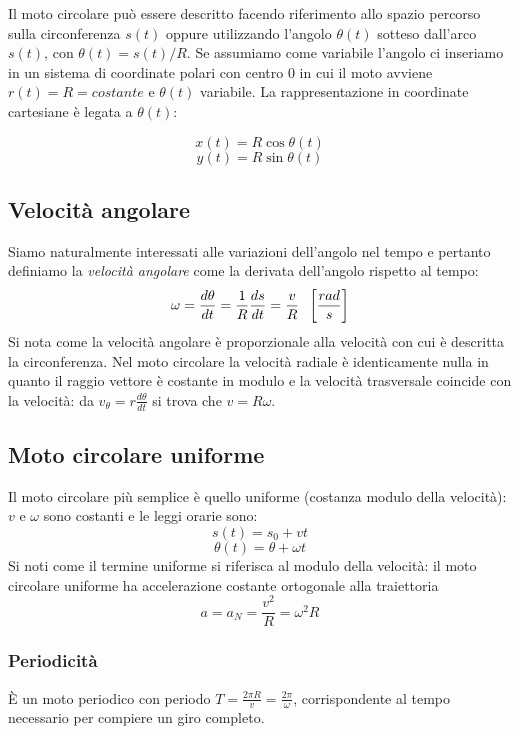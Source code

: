 \documentclass[class=book, crop=false, oneside, 12pt]{standalone}
\begin{document}
Il moto circolare può essere descritto facendo riferimento allo spazio percorso sulla circonferenza \(s(t)\) oppure
utilizzando l'angolo \(\theta (t)\) sotteso dall'arco \(s(t)\), con \(\theta(t) = s(t)/R\).
Se assumiamo come variabile l'angolo ci inseriamo in un sistema di coordinate polari con centro \(0\) in cui il moto avviene \(r(t) = R = costante\) e \(\theta(t)\) variabile.
La rappresentazione in coordinate cartesiane \`e legata a $\theta(t)$:
\begin{multicols}{2}
  \noindent
  $$x(t)=R\cos\theta(t)$$
  $$y(t)=R\sin\theta(t)$$
\end{multicols}
  \subsection{Velocit\`a angolare}
  Siamo naturalmente interessati alle variazioni dell'angolo nel tempo e pertanto definiamo la \emph{velocità angolare} come la derivata dell'angolo rispetto al tempo:
  \begin{equation}
   \omega = \frac{d \theta}{dt} = \frac{1}{R} \frac {ds} {dt} = \frac{v}{R} \hspace{0.2cm} \left[\frac{rad}{s}\right]
  \end{equation}
	Si nota come la velocit\`a angolare \`e proporzionale alla velocit\`a con cui \`e descritta la circonferenza.
	Nel moto circolare la velocit\`a radiale \`e identicamente nulla in quanto il raggio vettore \`e costante in modulo e la velocit\`a trasversale coincide con la velocit\`a: da $v_\theta=r\frac{d\theta}{dt}$ si trova che $v=R\omega$.
  \subsection{Moto circolare uniforme}
  Il moto circolare più semplice è quello uniforme (costanza modulo della velocità): \(v\) e \(\omega\) sono costanti e le leggi orarie sono:
  \begin{equation}
    s(t) = s_0 + vt
  \end{equation}
  \begin{equation}
    \theta(t) = \theta + \omega t
  \end{equation}
  Si noti come il termine uniforme si riferisca al modulo della velocit\`a: il moto circolare uniforme ha accelerazione costante ortogonale alla traiettoria
  \begin{equation}
   a = a_N = \frac{v^2}{R} = \omega^2 R
  \end{equation}
    \subsubsection{Periodicit\`a}
    È un moto periodico con periodo \(T = \frac{2 \pi R}{v} = \frac{2 \pi}{\omega}\), corrispondente al tempo necessario per compiere un giro completo.
\end{document}
